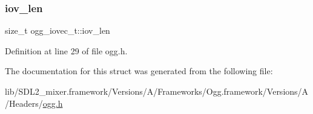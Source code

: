 \subsubsection{\texorpdfstring{iov\_len}{iov\_len}}
{\footnotesize\ttfamily size\+\_\+t ogg\+\_\+iovec\+\_\+t\+::iov\+\_\+len}



Definition at line 29 of file ogg.\+h.



The documentation for this struct was generated from the following file\+:\begin{DoxyCompactItemize}
\item 
lib/\+S\+D\+L2\+\_\+mixer.\+framework/\+Versions/\+A/\+Frameworks/\+Ogg.\+framework/\+Versions/\+A/\+Headers/\mbox{\hyperlink{ogg_8h}{ogg.\+h}}\end{DoxyCompactItemize}
